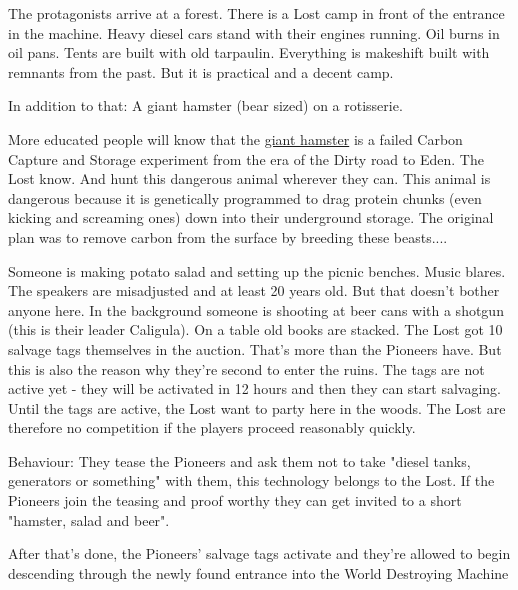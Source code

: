 The protagonists arrive at a forest. There is a Lost camp in front of the entrance in the machine. Heavy diesel cars stand with their engines running. Oil burns in oil pans. Tents are built with old tarpaulin. Everything is makeshift built with remnants from the past. But it is practical and a decent camp.

In addition to that: A giant hamster (bear sized) on a rotisserie.

\begin{sidebarBox}[title=Failed CCS experiment: Hamster]
More educated people will know that the \hyperref[sec: Giant Hamster]{giant hamster} is a failed Carbon Capture and Storage experiment from the era of the Dirty road to Eden. The Lost know. And hunt this dangerous animal wherever they can. This animal is dangerous because it is genetically programmed to drag protein chunks (even kicking and screaming ones) down into their underground storage. The original plan was to remove carbon from the surface by breeding these beasts....
\end{sidebarBox}


Someone is making potato salad and setting up the picnic benches. Music blares.
The speakers are misadjusted and at least 20 years old. But that doesn't bother anyone here. In the background someone is shooting at beer cans with a shotgun (this is their leader Caligula). On a table old books are stacked.
The Lost got 10 salvage tags themselves in the auction. That's more than the Pioneers have. But this is also the reason why they're second to enter the ruins. The tags are not active yet - they will be activated in 12 hours and then they can start salvaging. Until the tags are active, the Lost want to party
here in the woods. The Lost are therefore no competition if the players proceed reasonably quickly.

Behaviour: They tease the Pioneers and ask them not to take "diesel tanks, generators or something" with them, this technology belongs to the Lost. If the Pioneers join the teasing and proof worthy they can get invited to a short "hamster, salad and beer".

After that's done, the Pioneers' salvage tags activate and they're allowed to begin descending through the newly found entrance into the World Destroying Machine

